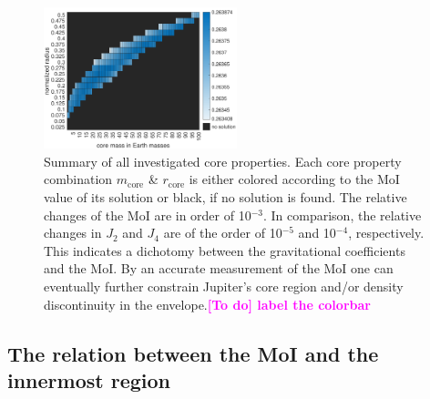 \documentclass[usenatbib]{mnras}
\newcommand{\TD}[1]{\textcolor{magenta}{\bf [To do] #1}}
\newcommand{\sub}[1]{_{\text{#1}}}
\begin{document}
\begin{figure}
    \centering
    \includegraphics[width = 0.5\textwidth]{Figures/jupiter_area_plotting_MoI_J4.pdf}
    \caption{Summary of all investigated core properties. Each core property combination $m\sub{core}$ \& $r\sub{core}$ is either colored according to the MoI value of its solution or black, if no solution is found. The relative changes of the MoI are in order of 10$^{-3}$. In comparison, the relative changes in $J_2$ and $J_4$ are of the order of 10$^{-5}$ and 10$^{-4}$, respectively. This indicates a dichotomy between the gravitational coefficients and the MoI. By an accurate measurement of the MoI one can eventually further constrain Jupiter's core region and/or density discontinuity in the envelope.\TD{label the colorbar}}
    \label{fig:jupiter_area_plotting_MoI}
\end{figure}

\subsection{The relation between the MoI and the innermost region} \label{subsection:MoI_vs_core}
\end{document}
